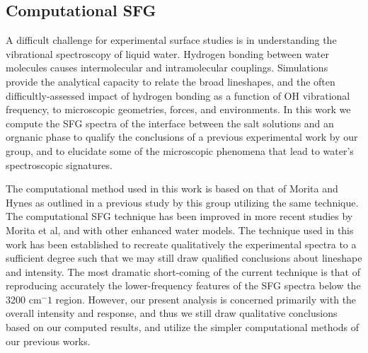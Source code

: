 


\subsection{Computational SFG}
A difficult challenge for experimental surface studies is in understanding the vibrational spectroscopy of liquid water. Hydrogen bonding between water molecules causes intermolecular and intramolecular couplings. Simulations provide the analytical capacity to relate the broad lineshapes, and the often difficultly-assessed impact of hydrogen bonding as a function of OH vibrational frequency, to microscopic geometries, forces, and environments. In this work we compute the SFG spectra of the interface between the salt solutions and an orgnanic phase to qualify the conclusions of a previous experimental work by our group,\cite{McFearin2009} and to elucidate some of the microscopic phenomena that lead to water's spectroscopic signatures.

The computational method used in this work is based on that of Morita and Hynes\cite{Morita2000} as outlined in a previous study by this group utilizing the same technique.\cite{Walker2007} The computational SFG technique has been improved in more recent studies by Morita et al,\cite{Morita2002,Ishiyama2009} and with other enhanced water models. The technique used in this work has been established to recreate qualitatively the experimental spectra to a sufficient degree such that we may still draw qualified conclusions about lineshape and intensity. The most dramatic short-coming of the current technique is that of reproducing accurately the lower-frequency features of the SFG spectra below the 3200 cm$^-1$ region. However, our present analysis is concerned primarily with the overall intensity and response, and thus we still draw qualitative conclusions based on our computed results, and utilize the simpler computational methods of our previous works.
